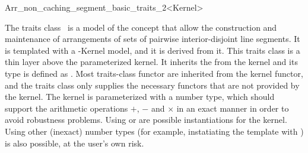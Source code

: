 
\ccRefPageBegin

\begin{ccRefClass}{Arr_non_caching_segment_basic_traits_2<Kernel>}
    
\ccDefinition 

The traits class \ccRefName\ is a model of the 
concept that allow the construction and maintenance of arrangements of
sets of pairwise interior-disjoint line segments. It is templated with a
\cgal-Kernel model, and it is derived from it. This traits class is a
thin layer above the parameterized kernel. It inherits the 
from the kernel and its  type is defined as
. Most traits-class functor are inherited from the
kernel functor, and the traits class only supplies the necessary functors
that are not provided by the kernel. The kernel is parameterized with a
number type, which should support the arithmetic operations $+$, $-$ and
$\times$ in an exact manner in order to avoid robustness problems.
Using  or  are possible
instantiations for the kernel. Using other (inexact) number types
(for example, instatiating the template with
) is also possible, at the user's own
risk.
    
 
\ccIsModel

\end{ccRefClass}
\ccRefPageEnd
